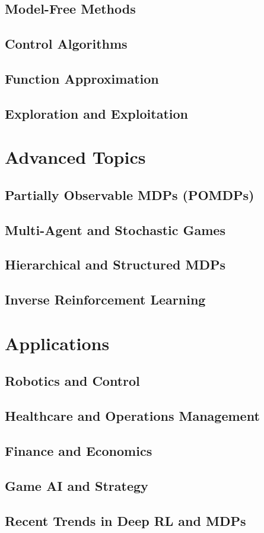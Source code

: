 \documentclass[12pt]{book}
\begin{document}
\chapter{Model-Free Methods}
\chapter{Control Algorithms}
\chapter{Function Approximation}
\chapter{Exploration and Exploitation}

\part{Advanced Topics}
\chapter{Partially Observable MDPs (POMDPs)}
\chapter{Multi-Agent and Stochastic Games}
\chapter{Hierarchical and Structured MDPs}
\chapter{Inverse Reinforcement Learning}

\part{Applications}
\chapter{Robotics and Control}
\chapter{Healthcare and Operations Management}
\chapter{Finance and Economics}
\chapter{Game AI and Strategy}
\chapter{Recent Trends in Deep RL and MDPs}

\backmatter
\end{document}

